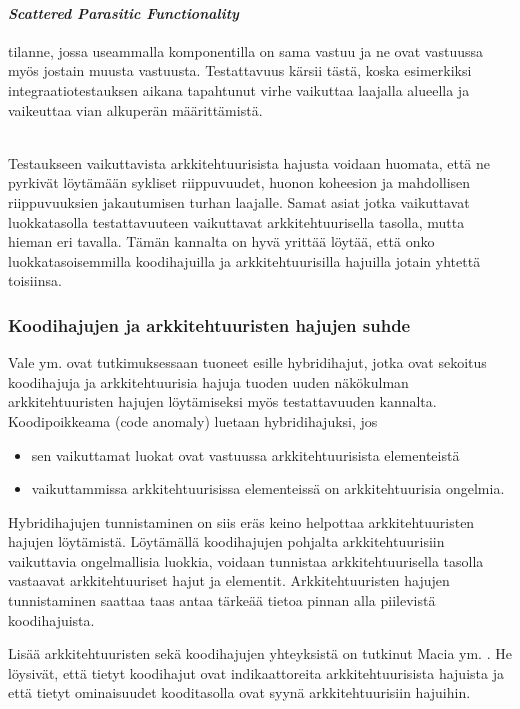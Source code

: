 \documentclass[finnish]{tktltiki2}
\numberwithin{table}{section}
\theoremstyle{definition}
\theoremstyle{remark}
\begin{document}
\paragraph{\textit{Scattered Parasitic Functionality}} tilanne, jossa useammalla komponentilla on sama vastuu ja ne ovat vastuussa myös jostain muusta vastuusta. Testattavuus kärsii tästä, koska esimerkiksi integraatiotestauksen aikana tapahtunut virhe vaikuttaa laajalla alueella ja vaikeuttaa vian alkuperän määrittämistä. 

\noindent
\\Testaukseen vaikuttavista arkkitehtuurisista hajusta voidaan huomata, että ne pyrkivät löytämään sykliset riippuvuudet, huonon koheesion ja mahdollisen riippuvuuksien jakautumisen turhan laajalle. Samat asiat jotka vaikuttavat luokkatasolla testattavuuteen vaikuttavat arkkitehtuurisella tasolla, mutta hieman eri tavalla. Tämän kannalta on hyvä yrittää löytää, että onko luokkatasoisemmilla koodihajuilla ja arkkitehtuurisilla hajuilla jotain yhtettä toisiinsa. 


\subsubsection{Koodihajujen ja arkkitehtuuristen hajujen suhde}

Vale ym. ovat tutkimuksessaan tuoneet esille hybridihajut, jotka ovat sekoitus koodihajuja ja arkkitehtuurisia hajuja tuoden uuden näkökulman arkkitehtuuristen hajujen löytämiseksi myös testattavuuden kannalta. Koodipoikkeama (code anomaly) luetaan hybridihajuksi, jos \citep{vale_bad_2014}

\begin{itemize}
	\item sen vaikuttamat luokat ovat vastuussa arkkitehtuurisista elementeistä
	\item vaikuttammissa arkkitehtuurisissa elementeissä on arkkitehtuurisia ongelmia.
\end{itemize}

\noindent
Hybridihajujen tunnistaminen on siis eräs keino helpottaa arkkitehtuuristen hajujen löytämistä. Löytämällä koodihajujen pohjalta arkkitehtuurisiin vaikuttavia ongelmallisia luokkia, voidaan tunnistaa arkkitehtuurisella tasolla vastaavat arkkitehtuuriset hajut ja elementit. Arkkitehtuuristen hajujen tunnistaminen saattaa taas antaa tärkeää tietoa pinnan alla piilevistä koodihajuista.

Lisää arkkitehtuuristen sekä koodihajujen yhteyksistä on tutkinut Macia ym. \citep{macia_impact_2011}. He löysivät, että tietyt koodihajut ovat indikaattoreita arkkitehtuurisista hajuista ja että tietyt ominaisuudet kooditasolla ovat syynä arkkitehtuurisiin hajuihin. 
\end{document}
